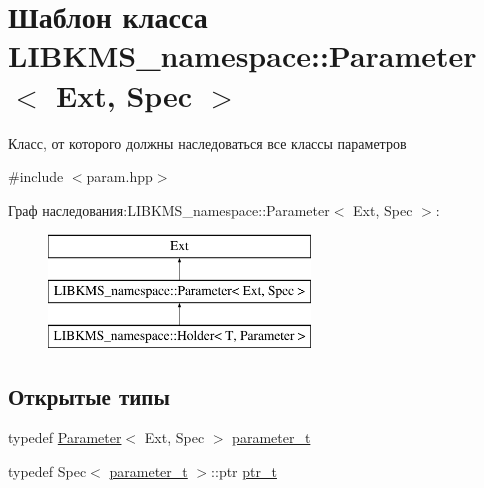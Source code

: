\hypertarget{classLIBKMS__namespace_1_1Parameter}{\section{Шаблон класса L\-I\-B\-K\-M\-S\-\_\-namespace\-:\-:Parameter$<$ Ext, Spec $>$}
\label{classLIBKMS__namespace_1_1Parameter}
}


Класс, от которого должны наследоваться все классы параметров  




{\ttfamily \#include $<$param.\-hpp$>$}

Граф наследования\-:L\-I\-B\-K\-M\-S\-\_\-namespace\-:\-:Parameter$<$ Ext, Spec $>$\-:\begin{figure}[H]
\begin{center}
\leavevmode
\includegraphics[height=3.000000cm]{classLIBKMS__namespace_1_1Parameter}
\end{center}
\end{figure}
\subsection*{Открытые типы}
\begin{DoxyCompactItemize}
\item 
typedef \hyperlink{classLIBKMS__namespace_1_1Parameter}{Parameter}$<$ Ext, Spec $>$ \hyperlink{classLIBKMS__namespace_1_1Parameter_af353e23edea754f9a2d1c936cd5c8eab}{parameter\-\_\-t}
\item 
typedef Spec$<$ \hyperlink{classLIBKMS__namespace_1_1Parameter_af353e23edea754f9a2d1c936cd5c8eab}{parameter\-\_\-t} $>$\-::ptr \hyperlink{classLIBKMS__namespace_1_1Parameter_a28516bcd5bad5857b2d1c676e4176f51}{ptr\-\_\-t}
\end{DoxyCompactItemize}
